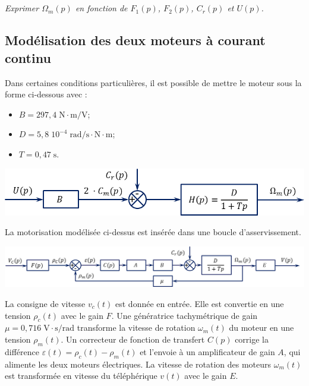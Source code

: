 \documentclass[10pt]{article}
\newif\ifprof
\begin{document}
\subparagraph{}
\textit{Exprimer $\Omega_m(p)$ en fonction de $F_1 (p)$, $F_2 (p)$, $C_r (p)$ et $U(p)$.}
\ifprof
\begin{corrige}
\end{corrige}
\else
\fi

\subsection*{Modélisation des deux moteurs à courant continu}

\vspace{.25cm}

\begin{minipage}[c]{.4\linewidth}
Dans certaines conditions particulières, il est possible de mettre le moteur sous la forme ci-dessous avec :
\begin{itemize}
\item $B=297,4\; \text{N}\cdot \text{m⁄V}$;
\item $D=5,8\;10^{-4} \;  \text{rad⁄s}\cdot \text{N}\cdot\text{m}$;
\item $T=0,47\;\text{s}$.
\end{itemize}
\end{minipage}\hfill
\begin{minipage}[c]{.59\linewidth}
\begin{center}
\includegraphics[width=.9\textwidth]{images/SchemaBloc_02}
\end{center}
\end{minipage}

\vspace{.25cm}

La motorisation modélisée ci-dessus est insérée dans une boucle d’asservissement.

\begin{center}
\includegraphics[width=\textwidth]{images/SchemaBloc_03}
\end{center}


La consigne de vitesse $v_c(t)$ est donnée en entrée. Elle est convertie en une tension $\rho_c(t)$ avec le gain $F$. Une génératrice tachymétrique de gain $\mu =0,716 \; \text{V}\cdot \text{s/rad}$ transforme la vitesse de rotation $\omega_m(t)$ du moteur en une tension $\rho_m(t)$. Un correcteur de fonction de transfert $C(p)$ corrige la différence $\varepsilon (t)= \rho_c(t) -  \rho_m(t)$ et l’envoie à un amplificateur de gain $A$, qui alimente les deux moteurs électriques. La vitesse de rotation des moteurs $\omega_m(t)$ est transformée en vitesse du téléphérique $v(t)$ avec le gain $E$.
\end{document}

